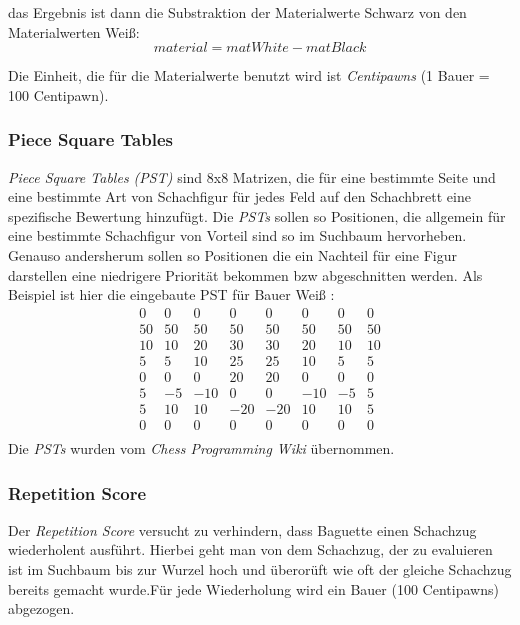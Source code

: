 das Ergebnis ist dann die Substraktion der Materialwerte Schwarz von den Materialwerten Weiß: 
$$
material = matWhite - matBlack
$$

Die Einheit, die f\"ur die Materialwerte benutzt wird ist \textit{Centipawns} (1 Bauer = 100 Centipawn).

\subsubsection{Piece Square Tables}
\textit{Piece Square Tables (PST)} sind  8x8 Matrizen, die für eine bestimmte Seite und eine bestimmte Art von Schachfigur für jedes Feld auf den Schachbrett eine spezifische Bewertung hinzuf\"ugt.
Die \textit{PSTs} sollen so Positionen, die allgemein f\"ur eine bestimmte Schachfigur von Vorteil sind so im Suchbaum hervorheben. Genauso andersherum sollen so Positionen die ein Nachteil f\"ur eine Figur darstellen eine niedrigere Priorit\"at bekommen bzw abgeschnitten werden.
\newline Als Beispiel ist hier die eingebaute PST für Bauer Weiß : 
$$
\begin{matrix}
         0 &  0 &  0 &  0 &  0 &  0 &  0 &  0 \\
        50 & 50 & 50 & 50 & 50 & 50 & 50 & 50 \\
        10 & 10 & 20 & 30 & 30 & 20 & 10 & 10 \\
         5 &  5 & 10 & 25 & 25 & 10 &  5 &  5 \\
         0 &  0 &  0 & 20 & 20 &  0 &  0 &  0 \\
         5 & -5 &-10 &  0 &  0 &-10 & -5 &  5 \\
         5 & 10 & 10 &-20 &-20 & 10 & 10 &  5 \\
         0 &  0 &  0 &  0 &  0 &  0 &  0 &  0 \\
\end{matrix}
$$
Die \textit{PSTs} wurden vom \textit{Chess Programming Wiki} \citeeval[] \"ubernommen.

\subsubsection{Repetition Score}
Der \textit{Repetition Score} versucht zu verhindern, dass Baguette einen Schachzug wiederholent ausf\"uhrt.\newline
Hierbei geht man von dem Schachzug, der zu evaluieren ist im Suchbaum bis zur Wurzel hoch und \"uberor\"uft wie oft der gleiche Schachzug bereits gemacht wurde.\newline F\"ur jede Wiederholung wird ein Bauer (100 Centipawns) abgezogen.
